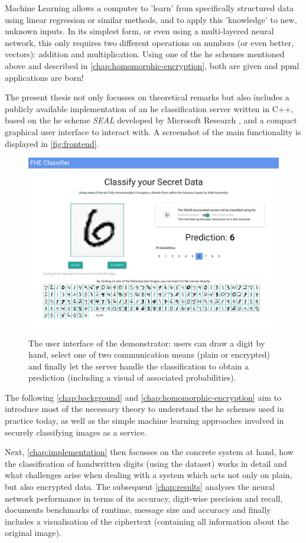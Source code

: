 Machine Learning allows a computer to 'learn' from specifically structured data using linear regression or similar methods, and to apply this 'knowledge' to new, unknown inputs.
In its simplest form, or even using a multi-layered neural network, this only requires two different operations on numbers (or even better, vectors): addition and multiplication.
Using one of the \gls{he} schemes mentioned above and described in \autoref{chap:homomorphic-encryption}, both are given and \gls{ppml} applications are born!

The present thesis not only focusses on theoretical remarks but also includes a publicly available implementation of an \gls{he} classification server written in C++, based on the \glsdesc{he} scheme \textit{SEAL} developed by Microsoft Research \parencite{seal-4.0}, and a compact graphical user interface to interact with.
A screenshot of the main functionality is displayed in \autoref{fig:frontend}.

\begin{figure}[H]
  \centering
  \includegraphics[width=\linewidth]{figures/frontend.pdf}
  \vspace{-1.2cm}
  \caption{The user interface of the demonstrator: users can draw a digit by hand, select one of two communication means (plain or encrypted) and finally let the server handle the classification to obtain a prediction (including a visual of associated probabilities).}
  \label{fig:frontend}
\end{figure}

The following \autoref{chap:background} and \autoref{chap:homomorphic-encryption} aim to introduce most of the necessary theory to understand the \gls{he} schemes used in practice today, as well as the simple machine learning approaches involved in securely classifying images as a service.

Next, \autoref{chap:implementation} then focusses on the concrete system at hand, how the classification of handwritten digits (using the  dataset) works in detail and what challenges arise when dealing with a system which acts not only on plain, but also encrypted data.
The subsequent \autoref{chap:results} analyses the neural network performance in terms of its accuracy, digit-wise precision and recall, documents benchmarks of runtime, message size and accuracy and finally includes a visualisation of the ciphertext (containing all information about the original image).
